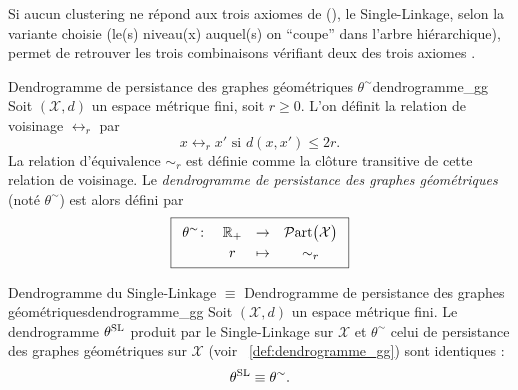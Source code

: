 

Si aucun clustering ne répond aux trois axiomes de  (), le Single-Linkage, selon la variante choisie (le(s) niveau(x) auquel(s) on ``coupe'' dans l'arbre hiérarchique), permet de retrouver les trois combinaisons vérifiant deux des trois axiomes \cite{Kleinberg2002}. 



\begin{Definition}{Dendrogramme de persistance des graphes géométriques $\theta^{\sim}$}{dendrogramme_gg}
Soit $(\mathcal X,d)$ un espace métrique fini, soit $r\ge 0$. L'on définit la relation de voisinage $\leftrightarrow_r$ par
\[
    x\leftrightarrow_r x' \text{ si } d(x,x') \le 2r.
\]
La relation d'équivalence $\sim_r$ est définie comme la clôture transitive de cette relation de voisinage.
Le \emph{dendrogramme de persistance des graphes géométriques} (noté $\theta^{\sim}$) est alors défini par 
\[
\boxed{
    \renewcommand{\arraystretch}{1.2} %
    \begin{array}{c c c c}
        \theta^{\sim}\colon & \mathbb R_+ & \to & \Partitions{\mathcal X} \\
                 & r & \mapsto & \sim_r
    \end{array}
}
\]
\end{Definition}

\begin{Resultat}{Dendrogramme du Single-Linkage $\equiv$ Dendrogramme de persistance des graphes géométriques}{dendrogramme_gg}
Soit $(\mathcal X,d)$ un espace métrique fini. Le dendrogramme $\theta^{\mathrm{SL}}$ produit par le Single-Linkage sur $\mathcal X$ et $\theta^{\sim}$ celui de persistance des graphes géométriques sur $\mathcal X$ (voir \Def~\ref{def:dendrogramme_gg}) sont identiques :
\[
    \theta^{\mathrm{SL}} \equiv \theta^{\sim}.
\]
\end{Resultat}

